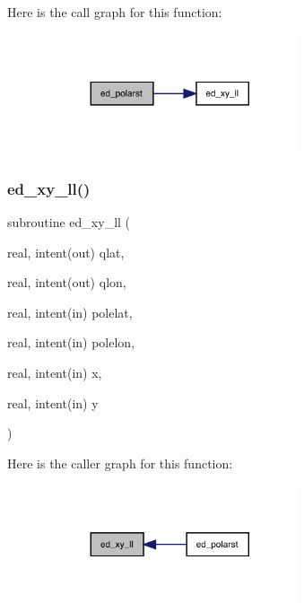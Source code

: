 Here is the call graph for this function\+:
\nopagebreak
\begin{figure}[H]
\begin{center}
\leavevmode
\includegraphics[width=212pt]{ed__grid_8f90_a086bde332f24bfe809a5abbdeef98c55_cgraph}
\end{center}
\end{figure}
\mbox{\label{ed__grid_8f90_a6e6353b40d999c1efa25011506d4cca3}} 
\subsubsection{\texorpdfstring{ed\+\_\+xy\+\_\+ll()}{ed\_xy\_ll()}}
{\footnotesize\ttfamily subroutine ed\+\_\+xy\+\_\+ll (\begin{DoxyParamCaption}\item[{real, intent(out)}]{qlat,  }\item[{real, intent(out)}]{qlon,  }\item[{real, intent(in)}]{polelat,  }\item[{real, intent(in)}]{polelon,  }\item[{real, intent(in)}]{x,  }\item[{real, intent(in)}]{y }\end{DoxyParamCaption})}

Here is the caller graph for this function\+:
\nopagebreak
\begin{figure}[H]
\begin{center}
\leavevmode
\includegraphics[width=212pt]{ed__grid_8f90_a6e6353b40d999c1efa25011506d4cca3_icgraph}
\end{center}
\end{figure}
